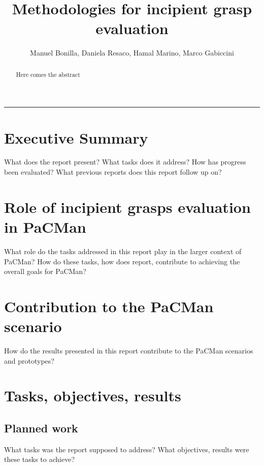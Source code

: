 \documentclass[a4paper,11pt,pdf]{pacmanreport}
\title{Methodologies for incipient grasp evaluation}
\author{Manuel Bonilla, Daniela Resaco, Hamal Marino, Marco Gabiccini}
\begin{document}
\maketitle

\begin{abstract}
\noindent Here comes the abstract
\end{abstract}


\vspace{.2em}
\hrule

\footnotesize

\tableofcontents

\normalsize

\newpage

\section*{Executive Summary}

What does the report present? What tasks does it address? How has progress been evaluated? What previous reports does this report follow up on? 

\section*{Role of incipient grasps evaluation in PaCMan}

What role do the tasks addressed in this report play in the larger context of PaCMan? How do these tasks, how does report, contribute to achieving the overall goals for PaCMan? 

\section*{Contribution to the PaCMan scenario}

How do the results presented in this report contribute to the PaCMan scenarios and prototypes? 


\newpage

\section{Tasks, objectives, results}

\subsection{Planned work}

What tasks was the report supposed to address? What objectives, results were these tasks to achieve? 
\end{document}
